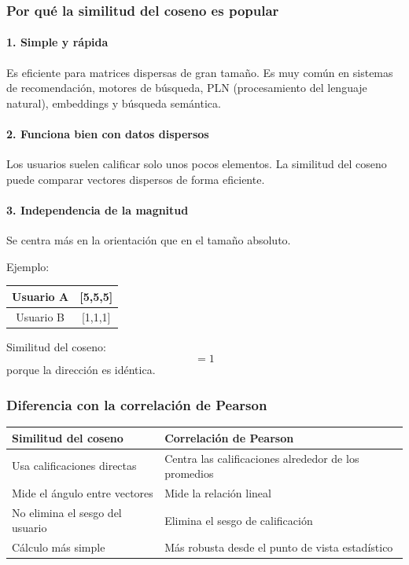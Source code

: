 \documentclass[12pt]{article}
\begin{document}
\subsubsection*{Por qué la similitud del coseno es popular}
\paragraph{1. Simple y rápida} Es eficiente para matrices dispersas de gran tamaño. Es muy común en sistemas de recomendación, motores de búsqueda, PLN (procesamiento del lenguaje natural), embeddings y búsqueda semántica.

\paragraph{2. Funciona bien con datos dispersos} Los usuarios suelen calificar solo unos pocos elementos. La similitud del coseno puede comparar vectores dispersos de forma eficiente.

\paragraph{3. Independencia de la magnitud} Se centra más en la orientación que en el tamaño absoluto.

Ejemplo:
\begin{center}
\begin{tabular}{|c|c|}
\hline
Usuario A & [5,5,5] \\
\hline
Usuario B & [1,1,1] \\
\hline
\end{tabular}
\end{center}
Similitud del coseno:
\[
=1
\]
porque la dirección es idéntica.

\subsubsection*{Diferencia con la correlación de Pearson}
\begin{center}
\begin{tabular}{|l|l|}
\hline
Similitud del coseno & Correlación de Pearson \\
\hline
Usa calificaciones directas & Centra las calificaciones alrededor de los promedios \\
Mide el ángulo entre vectores & Mide la relación lineal \\
No elimina el sesgo del usuario & Elimina el sesgo de calificación \\
Cálculo más simple & Más robusta desde el punto de vista estadístico \\
\hline
\end{tabular}
\end{center}
\end{document}
